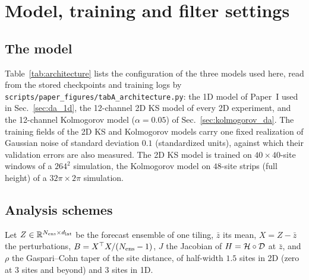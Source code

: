 \section{Model, training and filter settings}
\label{app:settings}

\subsection{The model}
\label{app:model}

Table~\ref{tab:architecture} lists the configuration of the three models
used here, read from the stored checkpoints and training logs by
\texttt{scripts/paper\_figures/tabA\_architecture.py}: the 1D model of Paper~I used in
Sec.~\ref{sec:da_1d}, the 12-channel 2D KS model of every 2D experiment, and the
12-channel Kolmogorov model ($\alpha=0.05$) of Sec.~\ref{sec:kolmogorov_da}. The training
fields of the 2D KS and Kolmogorov models carry one fixed realization of Gaussian noise of
standard deviation $0.1$ (standardized units), against which their validation errors are also
measured. The 2D KS model is trained on $40\times40$-site windows of a $264^2$ simulation, the
Kolmogorov model on $48$-site strips (full height) of a $32\pi\times2\pi$ simulation.

\begin{table}[htbp]
\caption{Architecture and training configuration. Reaches are radius
$\times$ layers in sites; the propagator mixes over a radius $w$ in each of
$n_\ell$ blocks of width $d_m$ (MLP ratio 4, output projection initialized to
zero). Stage~A trains the autoencoder, Stage~B the propagator with
forced-halo rollouts (2D) or on whole periodic domains (1D); the rollout
length is ramped $2\to k_{\mathrm{mid}}$ over the first $58\%$ of Stage~B and to
$k_{\max}$ by $70\%$. All runs use AdamW with linear warm-up and cosine decay,
weight decay $10^{-5}$, gradient clipping at 1, and training seed 0.
$^a$A signed latent spatial-coherence penalty (weight 0.01).}
\label{tab:architecture}
\end{table}

\subsection{Analysis schemes}
\label{app:da_filters}

Let $Z\in\mathbb{R}^{N_{\mathrm{ens}}\times d_{\mathrm{lat}}}$ be the forecast ensemble of one tiling, $\bar z$ its mean,
$X=Z-\bar z$ the perturbations, $B=X^\top X/(N_{\mathrm{ens}}-1)$, $J$ the Jacobian of $H=\mathcal{H}\circ\mathcal{D}$ at
$\bar z$, and $\rho$ the Gaspari--Cohn taper \citep{gaspari1999} of the site distance, of half-width
$1.5$ sites in 2D (zero at 3 sites and beyond) and 3 sites in 1D.

